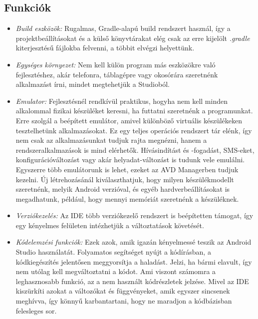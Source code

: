 \subsection{Funkciók}
\begin{itemize}
	\item \emph{Build eszközök:} Rugalmas, Gradle-alapú build rendszert használ, így a projektbeállításokat és a külső könyvtárakat elég csak az erre kijelölt \emph{.gradle} kiterjesztésű fájlokba felvenni, a többit elvégzi helyettünk.
	\item \emph{Egységes környezet:} Nem kell külön program más eszközökre való fejlesztéshez, akár telefonra, táblagépre vagy okosórára szeretnénk alkalmazást írni, mindet megtehetjük a Studioból.
	\item \emph{Emulator:} Fejlesztésnél rendkívül praktikus, hogyha nem kell minden alkalommal fizikai készüléket keresni, ha futtatni szeretnénk a programunkat. Erre szolgál a beépített emulátor, amivel különböző virtuális készülékeken tesztelhetünk alkalmazásokat. Ez egy teljes operációs rendszert tár elénk, így nem csak az alkalmazásunkat tudjuk rajta megnézni, hanem a rendszeralkalmazások is mind elérhetők. Hívásindítást és -fogadást, SMS-eket, konfigurációváltozást vagy akár helyadat-változást is tudunk vele emulálni. Egyszerre több emulátorunk is lehet, ezeket az AVD Managerben tudjuk kezelni. Új létrehozásánál kiválaszthatjuk, hogy milyen készülékmodellt szeretnénk, melyik Android verzióval, és egyéb hardverbeállításokat is megadhatunk, például, hogy mennyi memóriát szeretnénk a készüléknek.
	\item \emph{Verziókezelés:} Az IDE több verziókezelő rendszert is beépítetten támogat, így egy kényelmes felületen intézhetjük a változtatások követését.
	\item \emph{Kódelemzési funkciók:} Ezek azok, amik igazán kényelmessé teszik az Android Studio használatát. Folyamatos segítséget nyújt a kódírásban, a kódkiegészítés jelentősen meggyorsítja a haladást. Jelzi, ha bármi elavult, így nem utólag kell megváltoztatni a kódot. Ami viszont számomra a leghasznosabb funkció, az a nem használt kódrészletek jelzése. Mivel az IDE kiszürkíti azokat a változókat és függvényeket, amik egyszer sincsenek meghívva, így könnyű karbantartani, hogy ne maradjon a kódbázisban felesleges sor.
\end{itemize}



